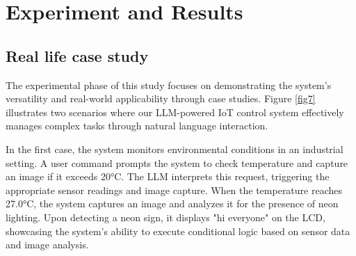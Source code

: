 \documentclass{ieeeaccess}
\begin{document}








\section{Experiment and Results}\label{sec:experiment}


\subsection{Real life case study}
The experimental phase of this study focuses on demonstrating the system's versatility and real-world applicability through case studies. Figure \ref{fig7} illustrates two scenarios where our LLM-powered IoT control system effectively manages complex tasks through natural language interaction.

In the first case, the system monitors environmental conditions in an industrial setting. A user command prompts the system to check temperature and capture an image if it exceeds 20°C. The LLM interprets this request, triggering the appropriate sensor readings and image capture. When the temperature reaches 27.0°C, the system captures an image and analyzes it for the presence of neon lighting. Upon detecting a neon sign, it displays "hi everyone" on the LCD, showcasing the system's ability to execute conditional logic based on sensor data and image analysis.
\end{document}
